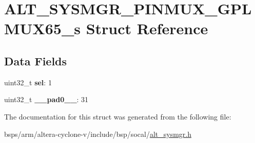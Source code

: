 \hypertarget{structALT__SYSMGR__PINMUX__GPLMUX65__s}{}\section{A\+L\+T\+\_\+\+S\+Y\+S\+M\+G\+R\+\_\+\+P\+I\+N\+M\+U\+X\+\_\+\+G\+P\+L\+M\+U\+X65\+\_\+s Struct Reference}
\label{structALT__SYSMGR__PINMUX__GPLMUX65__s}
\subsection*{Data Fields}
\begin{DoxyCompactItemize}
\item 
\mbox{\label{structALT__SYSMGR__PINMUX__GPLMUX65__s_aefd0d39e680334836b948704e7dc29c9}} 
uint32\+\_\+t {\bfseries sel}\+: 1
\item 
\mbox{\label{structALT__SYSMGR__PINMUX__GPLMUX65__s_aee806d195807bc956b5613788bdfb6c5}} 
uint32\+\_\+t {\bfseries \+\_\+\+\_\+pad0\+\_\+\+\_\+}\+: 31
\end{DoxyCompactItemize}


The documentation for this struct was generated from the following file\+:\begin{DoxyCompactItemize}
\item 
bsps/arm/altera-\/cyclone-\/v/include/bsp/socal/\mbox{\hyperlink{alt__sysmgr_8h}{alt\+\_\+sysmgr.\+h}}\end{DoxyCompactItemize}
